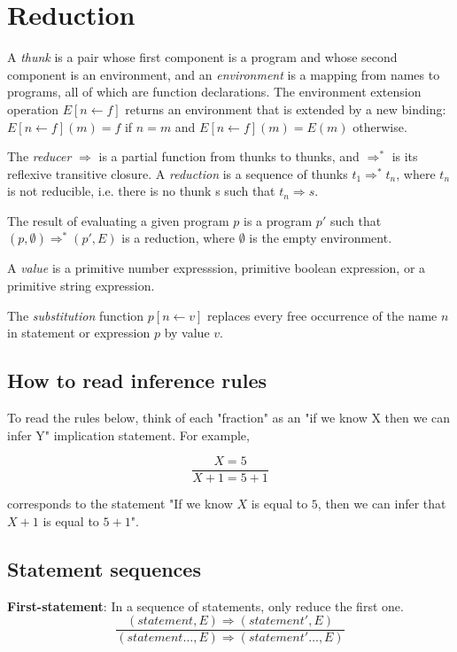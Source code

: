 \section*{Reduction}

A \emph{thunk} is a pair whose first component is a program
and whose
second component is an environment, and an
\emph{environment} is a mapping from names to programs, all of which are
function declarations. The environment extension operation
$E [ n \leftarrow f]$ returns an environment that is extended by
a new binding: $E[n \leftarrow f](m) = f$ if $n = m$ and
$E[n \leftarrow f](m) = E(m)$ otherwise.

The \emph{reducer} $\Rightarrow$ is a partial function from thunks to thunks,
and $\Rightarrow^*$ is its reflexive transitive closure.
A \emph{reduction} is a sequence of thunks
$t_1 \Rightarrow^* t_n$, where $t_n$ is not reducible, i.e. there is no thunk
s such that $t_n \Rightarrow s$.

The result of evaluating a given program $p$ is a program $p'$
such that $(p, \emptyset) \Rightarrow^* (p', E)$ is a reduction,
where $\emptyset$ is the empty environment.

A \emph{value} is a primitive number expresssion, primitive boolean expression,
or a primitive string expression.

The \emph{substitution} function
$p [ n \leftarrow v ]$ replaces every free occurrence of the name $n$
in statement or expression $p$ by value $v$.

\subsection*{How to read inference rules}

To read the rules below, think of each "fraction" as an
"if we know X then we can infer Y" implication statement.
For example,

\[
\frac{
  X = 5
}{
  X + 1 = 5 + 1
}
\]

corresponds to the statement
"If we know $X$ is equal to $5$,
then we can infer that $X + 1$ is equal to $5 + 1$".

\subsection*{Statement sequences}


\textbf{First-statement}: In a sequence of statements, only reduce the first
one.
\[
\frac{
  (\textit{statement},E) \Rightarrow (\textit{statement}',E)
}{
  (\textit{statement} \ldots, E)
  \Rightarrow
  (\textit{statement}' \ldots, E)
}
\]

